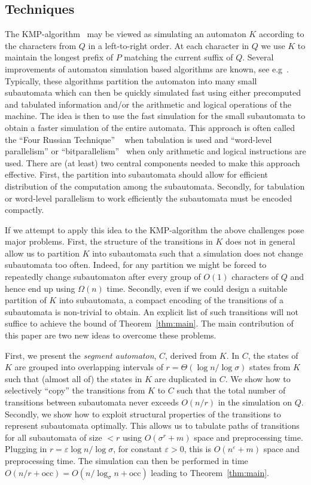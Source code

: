 \documentclass{article}
\newcommand{\occ}{\ensuremath{\mathrm{occ}}}
\begin{document}
\subsection{Techniques}\label{sec:techniques}
The KMP-algorithm~\cite{KMP1977} may be viewed as simulating an
automaton $K$ according to the characters from $Q$ in a left-to-right
order. At each character in $Q$ we use $K$ to maintain the longest
prefix of $P$ matching the current suffix of $Q$. Several improvements
of automaton simulation based algorithms are known, see
e.g~\cite{MP1980, Myers1992,BYG1992, WMM1995}. Typically, these
algorithms partition the automaton into many small subautomata which
can then be quickly simulated fast using either precomputed and
tabulated information and/or the arithmetic and logical operations of
the machine. The idea is then to use the fast simulation for the small
subautomata to obtain a faster simulation of the entire automata. This
approach is often called the ``Four Russian Technique''
~\cite{ADKF1970} when tabulation is used and ``word-level
parallelism'' or ``bitparallelism''~\cite{BaezaYates1989} when only
arithmetic and logical instructions are used. There are (at least) two
central components needed to make this approach effective. First, the
partition into subautomata should allow for efficient distribution of
the computation among the subautomata. Secondly, for tabulation or
word-level parallelism to work efficiently the subautomata must be
encoded compactly.


If we attempt to apply this idea to the KMP-algorithm the above
challenges pose major problems. First, the structure of the
transitions in $K$ does not in general allow us to partition $K$ into
subautomata such that a simulation does not change subautomata too
often. Indeed, for any partition we might be forced to repeatedly
change subautomaton after every group of $O(1)$ characters of $Q$ and
hence end up using $\Omega(n)$ time. Secondly, even if we could design
a suitable partition of $K$ into subautomata, a compact encoding of
the transitions of a subautomata is non-trivial to obtain. An explicit
list of such transitions will not suffice to achieve the bound of
Theorem~\ref{thm:main}. The main contribution of this paper are two
new ideas to overcome these problems.


First, we present the \emph{segment automaton}, $C$, derived from $K$.
In $C$, the states of $K$ are grouped into overlapping intervals of $r
= \Theta(\log n/ \log \sigma)$ states from $K$ such that (almost all
of) the states in $K$ are duplicated in $C$. We show how to
selectively ``copy'' the transitions from $K$ to $C$ such that the
total number of transitions between subautomata never exceeds $O(n/r)$
in the simulation on $Q$. Secondly, we show how to exploit structural
properties of the transitions to represent subautomata optimally. This
allows us to tabulate paths of transitions for all subautomata of size
$<r$ using $O(\sigma^r + m)$ space and preprocessing time. Plugging in
$r = \varepsilon \log n/ \log \sigma$, for constant $\varepsilon > 0$,
this is $O(n^{\varepsilon} + m)$ space and preprocessing time. The
simulation can then be performed in time $O(n/r + \occ) =
O(n/\log_\sigma n + \occ)$ leading to Theorem~\ref{thm:main}.
\end{document}
